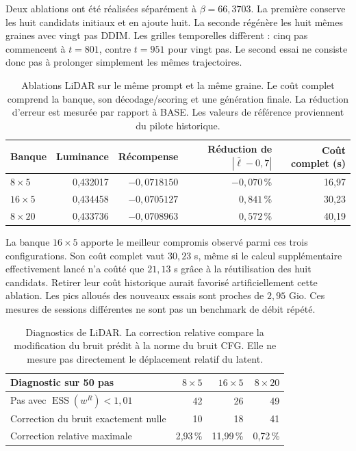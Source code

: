 \documentclass[11pt,a4paper]{article}
\newcommand{\ESS}{\operatorname{ESS}}
\begin{document}
Deux ablations ont été réalisées séparément à $\beta=66{,}3703$. La première conserve les huit candidats initiaux et en ajoute huit. La seconde régénère les huit mêmes graines avec vingt pas DDIM. Les grilles temporelles diffèrent : cinq pas commencent à $t=801$, contre $t=951$ pour vingt pas. Le second essai ne consiste donc pas à prolonger simplement les mêmes trajectoires.
\begin{table}[htbp]
\centering\small
\setlength{\tabcolsep}{4pt}
\begin{tabular}{lrrrr}
\toprule
Banque & Luminance & Récompense & Réduction de $|\bar\ell-0,7|$ & Coût complet (s)\\
\midrule
$8\times5$ & 0,432017 & $-0,0718150$ & $-0,070$\,\% & 16,97\\
$16\times5$ & 0,434458 & $-0,0705127$ & $0,841$\,\% & 30,23\\
$8\times20$ & 0,433736 & $-0,0708963$ & $0,572$\,\% & 40,19\\
\bottomrule
\end{tabular}
\caption{Ablations LiDAR sur le même prompt et la même graine. Le coût complet comprend la banque, son décodage/scoring et une génération finale. La réduction d'erreur est mesurée par rapport à BASE. Les valeurs de référence proviennent du pilote historique.}
\label{tab:lidar}
\end{table}

La banque $16\times5$ apporte le meilleur compromis observé parmi ces trois configurations. Son coût complet vaut $30{,}23$ s, même si le calcul supplémentaire effectivement lancé n'a coûté que $21{,}13$ s grâce à la réutilisation des huit candidats. Retirer leur coût historique aurait favorisé artificiellement cette ablation. Les pics alloués des nouveaux essais sont proches de $2{,}95$ Gio. Ces mesures de sessions différentes ne sont pas un benchmark de débit répété.

\begin{table}[htbp]
\centering\small
\begin{tabular}{lrrr}
\toprule
Diagnostic sur 50 pas & $8\times5$ & $16\times5$ & $8\times20$\\
\midrule
Pas avec $\ESS(w^R)<1{,}01$ & 42 & 26 & 49\\
Correction du bruit exactement nulle & 10 & 18 & 41\\
Correction relative maximale & 2,93\,\% & 11,99\,\% & 0,72\,\%\\
\bottomrule
\end{tabular}
\caption{Diagnostics de LiDAR. La correction relative compare la modification du bruit prédit à la norme du bruit CFG. Elle ne mesure pas directement le déplacement relatif du latent.}
\label{tab:ess}
\end{table}
\end{document}
